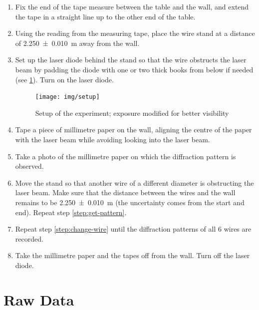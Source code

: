 \documentclass[a4paper, 12pt]{article}
\begin{document}
\begin{enumerate}
\itemsep 0.2em
    \item Fix the end of the tape measure between the table and the wall, and extend the tape in a straight line up to the other end of the table.
    \item Using the reading from the measuring tape, place the wire stand at a distance of \SI{2.250+-0.010}{\m} away from the wall. \label{step:place-stand}
    \item Set up the laser diode behind the stand so that the wire obstructs the laser beam by padding the diode with one or two thick books from below if needed (see \cref{fig:setup}). Turn on the laser diode. \label{step:place-laser}
\begin{figure}[H]
    \centering
    \texttt{[image: img/setup]}
    \caption{Setup of the experiment; exposure modified for better visibility}
    \label{fig:setup}
\end{figure}
    \item Tape a piece of millimetre paper on the wall, aligning the centre of the paper with the laser beam while avoiding looking into the laser beam.
    \item Take a photo of the millimetre paper on which the diffraction pattern is observed. \label{step:get-pattern}
    \item Move the stand so that another wire of a different diameter is obstructing the laser beam. Make sure that the distance between the wires and the wall remains to be \SI{2.250+-0.010}{\m} (the uncertainty comes from the start and end). Repeat step \ref{step:get-pattern}. \label{step:change-wire}
    \item Repeat step \ref{step:change-wire} until the diffraction patterns of all 6 wires are recorded. \label{step:iterate-wire}
    \item Take the millimetre paper and the tapes off from the wall. Turn off the laser diode. \label{step:clean-up}
\end{enumerate}

\section{Raw Data}
\end{document}
